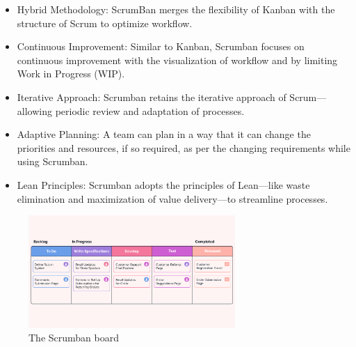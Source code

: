 \begin{itemize}
    \item Hybrid Methodology: ScrumBan merges the flexibility of Kanban with the structure of Scrum to optimize workflow.
    \item Continuous Improvement: Similar to Kanban, Scrumban focuses on continuous improvement with the visualization of workflow and by limiting Work in Progress (WIP).
    \item Iterative Approach: Scrumban retains the iterative approach of Scrum—allowing periodic review and adaptation of processes.
    \item Adaptive Planning: A team can plan in a way that it can change the priorities and resources, if so required, as per the changing requirements while using Scrumban.
    \item Lean Principles: Scrumban adopts the principles of Lean—like waste elimination and maximization of value delivery—to streamline processes.
\end{itemize}

\begin{figure}[H]
    \centering
    \includegraphics[width=0.7\textwidth]{src/assets/chapters/Scrumban.png}
    \caption{The Scrumban board}
    \label{fig:Scrumban_image}
\end{figure}


